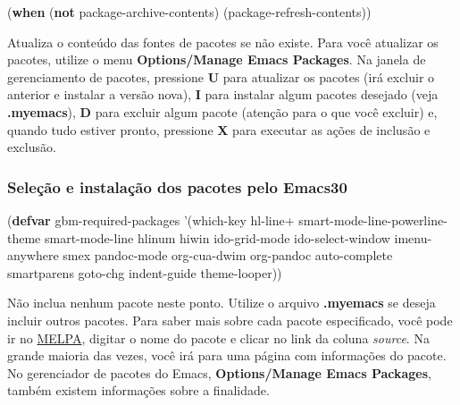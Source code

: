\documentclass[]{article}
\newenvironment{Shaded}{}{}
\newcommand{\KeywordTok}[1]{\textcolor[rgb]{0.00,0.44,0.13}{\textbf{{#1}}}}
\newcommand{\FunctionTok}[1]{\textcolor[rgb]{0.02,0.16,0.49}{{#1}}}
\newcommand{\NormalTok}[1]{{#1}}
\begin{document}
\begin{Shaded}
\begin{Highlighting}[]
\NormalTok{(}\KeywordTok{when} \NormalTok{(}\KeywordTok{not} \NormalTok{package-archive-contents)}
  \NormalTok{(package-refresh-contents))}
\end{Highlighting}
\end{Shaded}

Atualiza o conteúdo das fontes de pacotes se não existe. Para você
atualizar os pacotes, utilize o menu \textbf{Options/Manage Emacs
Packages}. Na janela de gerenciamento de pacotes, pressione \textbf{U}
para atualizar os pacotes (irá excluir o anterior e instalar a versão
nova), \textbf{I} para instalar algum pacotes desejado (veja
\textbf{.myemacs}), \textbf{D} para excluir algum pacote (atenção para o
que você excluir) e, quando tudo estiver pronto, pressione \textbf{X}
para executar as ações de inclusão e exclusão.

\subsubsection{Seleção e instalação dos pacotes pelo
Emacs30}\label{seleuxe7uxe3o-e-instalauxe7uxe3o-dos-pacotes-pelo-emacs30}

\begin{Shaded}
\begin{Highlighting}[]
\NormalTok{(}\KeywordTok{defvar}\FunctionTok{ gbm-required-packages}
  \NormalTok{'(which-key}
    \NormalTok{hl-line+}
    \NormalTok{smart-mode-line-powerline-theme}
    \NormalTok{smart-mode-line}
    \NormalTok{hlinum}
    \NormalTok{hiwin}
    \NormalTok{ido-grid-mode}
    \NormalTok{ido-select-window}
    \NormalTok{imenu-anywhere}
    \NormalTok{smex}
    \NormalTok{pandoc-mode}
    \NormalTok{org-cua-dwim}
    \NormalTok{org-pandoc}
    \NormalTok{auto-complete}
    \NormalTok{smartparens}
    \NormalTok{goto-chg}
    \NormalTok{indent-guide}
    \NormalTok{theme-looper))}
\end{Highlighting}
\end{Shaded}

Não inclua nenhum pacote neste ponto. Utilize o arquivo
\textbf{.myemacs} se deseja incluir outros pacotes. Para saber mais
sobre cada pacote especificado, você pode ir no
\href{https://melpa.org/}{MELPA}, digitar o nome do pacote e clicar no
link da coluna \emph{source}. Na grande maioria das vezes, você irá para
uma página com informações do pacote. No gerenciador de pacotes do
Emacs, \textbf{Options/Manage Emacs Packages}, também existem
informações sobre a finalidade.
\end{document}
